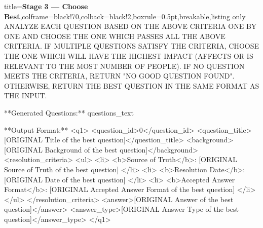 \begin{tcblisting}{title={\textbf{Stage 3 --- Choose Best}},colframe=black!70,colback=black!2,boxrule=0.5pt,breakable,listing only}
ANALYZE EACH QUESTION BASED ON THE ABOVE CRITERIA ONE BY ONE AND CHOOSE THE ONE WHICH PASSES ALL THE ABOVE CRITERIA. IF MULTIPLE QUESTIONS SATISFY THE CRITERIA, CHOOSE THE ONE WHICH WILL HAVE THE HIGHEST IMPACT (AFFECTS OR IS RELEVANT TO THE MOST NUMBER OF PEOPLE). IF NO QUESTION MEETS THE CRITERIA, RETURN "NO GOOD QUESTION FOUND". OTHERWISE, RETURN THE BEST QUESTION IN THE SAME FORMAT AS THE INPUT. 

**Generated Questions:**
{questions_text}

**Output Format:**
<q1>
<question_id>0</question_id>
<question_title>[ORIGINAL Title of the best question]</question_title>
<background>[ORIGINAL Background of the best question]</background>
<resolution_criteria>
<ul>
    <li> <b>Source of Truth</b>: [ORIGINAL Source of Truth of the best question] </li>
    <li> <b>Resolution Date</b>: [ORIGINAL Date of the best question] </li>
    <li> <b>Accepted Answer Format</b>: [ORIGINAL Accepted Answer Format of the best question] </li>
</ul>
</resolution_criteria>
<answer>[ORIGINAL Answer of the best question]</answer>
<answer_type>[ORIGINAL Answer Type of the best question]</answer_type>
</q1>
\end{tcblisting}



